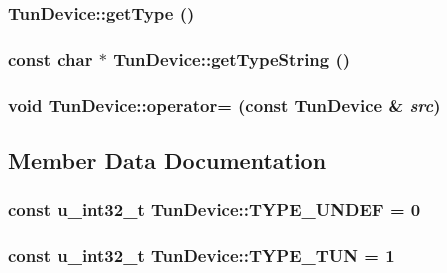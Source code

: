 \subsubsection{ Tun\-Device::get\-Type ()}\label{classTunDevice_b57512464007681dcc92820adb3deb0f}


\subsubsection{\setlength{\rightskip}{0pt plus 5cm}const char $\ast$ Tun\-Device::get\-Type\-String ()}\label{classTunDevice_eb99a885d90822b00e623ca02c2b06cc}


\subsubsection{\setlength{\rightskip}{0pt plus 5cm}void Tun\-Device::operator= (const {\bf Tun\-Device} \& {\em src})\hspace{0.3cm}{\tt  [private]}}\label{classTunDevice_de33e9a7a951b43f2f7e24d8fe9c311e}




\subsection{Member Data Documentation}
\subsubsection{\setlength{\rightskip}{0pt plus 5cm}const {\bf u\_\-int32\_\-t} {\bf Tun\-Device::TYPE\_\-UNDEF} = 0\hspace{0.3cm}{\tt  [static]}}\label{classTunDevice_ec146b27c7755747c1cc1511e4482875}


\subsubsection{\setlength{\rightskip}{0pt plus 5cm}const {\bf u\_\-int32\_\-t} {\bf Tun\-Device::TYPE\_\-TUN} = 1\hspace{0.3cm}{\tt  [static]}}\label{classTunDevice_ea416d7f03ef22bf1d166d33b47fd993}



